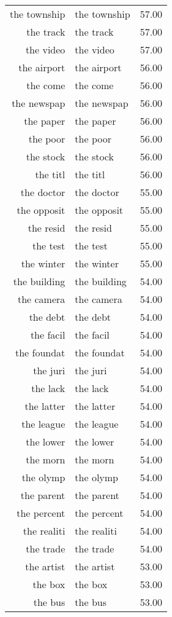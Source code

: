 \begin{table}[ht]
\begin{tabular}{rlr}
  the township & the township & 57.00 \\ 
  the track & the track & 57.00 \\ 
  the video & the video & 57.00 \\ 
  the airport & the airport & 56.00 \\ 
  the come & the come & 56.00 \\ 
  the newspap & the newspap & 56.00 \\ 
  the paper & the paper & 56.00 \\ 
  the poor & the poor & 56.00 \\ 
  the stock & the stock & 56.00 \\ 
  the titl & the titl & 56.00 \\ 
  the doctor & the doctor & 55.00 \\ 
  the opposit & the opposit & 55.00 \\ 
  the resid & the resid & 55.00 \\ 
  the test & the test & 55.00 \\ 
  the winter & the winter & 55.00 \\ 
  the building & the building & 54.00 \\ 
  the camera & the camera & 54.00 \\ 
  the debt & the debt & 54.00 \\ 
  the facil & the facil & 54.00 \\ 
  the foundat & the foundat & 54.00 \\ 
  the juri & the juri & 54.00 \\ 
  the lack & the lack & 54.00 \\ 
  the latter & the latter & 54.00 \\ 
  the league & the league & 54.00 \\ 
  the lower & the lower & 54.00 \\ 
  the morn & the morn & 54.00 \\ 
  the olymp & the olymp & 54.00 \\ 
  the parent & the parent & 54.00 \\ 
  the percent & the percent & 54.00 \\ 
  the realiti & the realiti & 54.00 \\ 
  the trade & the trade & 54.00 \\ 
  the artist & the artist & 53.00 \\ 
  the box & the box & 53.00 \\ 
  the bus & the bus & 53.00 \\ 

\end{tabular}
\end{table}
